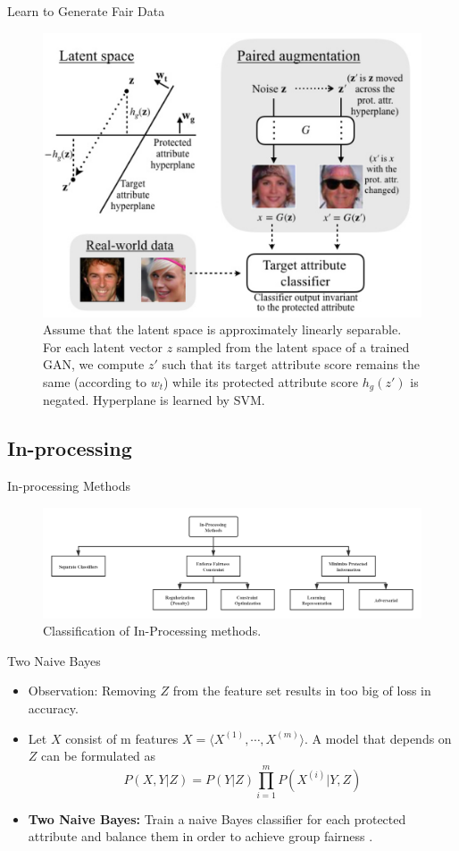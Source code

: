 \documentclass[10pt, xcolor=table,aspectratio=169]{beamer}
\begin{document}
\begin{frame}{Learn to Generate Fair Data}
	\begin{figure}[t]
		\begin{center}
			\includegraphics[width=0.5\columnwidth]{./figs/gan.png}
		\end{center}
		\caption{Assume that the latent space is approximately linearly separable. For each latent vector $z$ sampled from the latent space of a trained GAN, we compute $z'$ such that its target attribute score  remains the same (according to $w_t$) while its protected attribute score $h_g(z')$ is negated. Hyperplane is learned by SVM.}
	\end{figure}


\end{frame}

\subsection{In-processing}
\begin{frame}{In-processing Methods}
	\begin{figure}[t]
		\begin{center}
			\includegraphics[width=\columnwidth]{./figs/ipm.png}
		\end{center}
		\caption{Classification of In-Processing methods.}
	\end{figure}
\end{frame}
\begin{frame}{Two Naive Bayes}
	\begin{itemize}
		\item Observation: Removing $Z$ from the feature set results in too big of loss in accuracy.
		\item Let $X$ consist of m features  $X=\langle X^{(1)},\cdots,X^{(m)}\rangle$. A model that depends on $Z$ can be formulated as
		      \[P(X,Y|Z)=P(Y|Z)\prod_{i=1}^m P(X^{(i)}|Y,Z)\]

		\item \textbf{Two Naive Bayes:} Train a naive Bayes classifier for each protected attribute and balance them in order to achieve group fairness \cite{calders2010three}.
	\end{itemize}


\end{frame}
\end{document}
